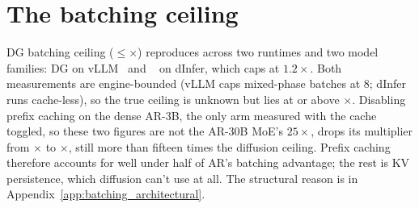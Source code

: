 \section{The batching ceiling}
\label{app:batching} DG batching ceiling ($\leq$\dgBatchVllmHi$\times$) reproduces across
two runtimes and two model families: DG on vLLM~\cite{vllm2023} and
\LLaDA~\cite{llada2025} on dInfer, which caps at $1.2\times$. Both
measurements are engine-bounded
(vLLM caps mixed-phase batches at 8; dInfer runs cache-less), so the
true ceiling is unknown but lies at or above \dgBatchVllmHi$\times$.
Disabling prefix caching on the dense AR-3B, the only arm measured
with the cache toggled, so these two figures are not the AR-30B MoE's
$25\times$, drops its multiplier from \cacheOnMult$\times$ to
\cacheOffMult$\times$, still more than fifteen times the diffusion
ceiling. Prefix caching therefore accounts for well under half of AR's
batching advantage; the rest is KV persistence, which diffusion can't
use at all. The structural reason is in
Appendix~\ref{app:batching_architectural}.
